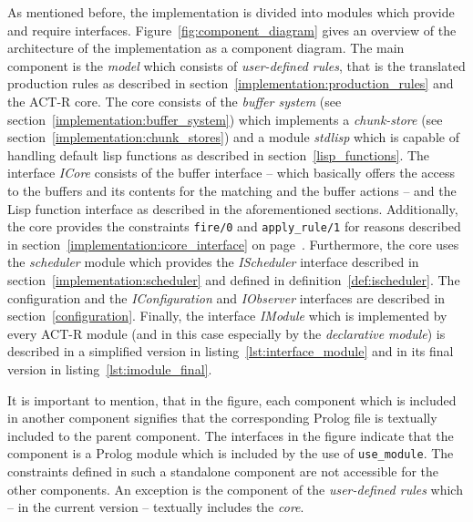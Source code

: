 As mentioned before, the implementation is divided into modules which provide and require interfaces. Figure~\ref{fig:component_diagram} gives an overview of the architecture of the implementation as a component diagram. The main component is the \emph{model} which consists of \emph{user-defined rules}, that is the translated production rules as described in section~\ref{implementation:production_rules} and the ACT-R core. The core consists of the \emph{buffer system} (see section~\ref{implementation:buffer_system}) which implements a \emph{chunk-store} (see section~\ref{implementation:chunk_stores}) and a module \emph{stdlisp} which is capable of handling default lisp functions as described in section~\ref{lisp_functions}. The interface \emph{ICore} consists of the buffer interface -- which basically offers the access to the buffers and its contents for the matching and the buffer actions -- and the Lisp function interface as described in the aforementioned sections. Additionally, the core provides the constraints \lstinline|fire/0| and \lstinline|apply_rule/1| for reasons described in section~\ref{implementation:icore_interface} on page~\pageref{implementation:icore_interface}. Furthermore, the core uses the \emph{scheduler} module which provides the \emph{IScheduler} interface described in section~\ref{implementation:scheduler} and defined in definition~\ref{def:ischeduler}. The configuration and the \emph{IConfiguration} and \emph{IObserver} interfaces are described in section~\ref{configuration}. Finally, the interface \emph{IModule} which is implemented by every ACT-R module (and in this case especially by the \emph{declarative module}) is described in a simplified version in listing~\ref{lst:interface_module} and in its final version in listing~\ref{lst:imodule_final}.

It is important to mention, that in the figure, each component which is included in another component signifies that the corresponding Prolog file is textually included to the parent component. The interfaces in the figure indicate that the component is a Prolog module which is included by the use of \lstinline|use_module|. The constraints defined in such a standalone component are not accessible for the other components. An exception is the component of the \emph{user-defined rules} which -- in the current version -- textually includes the \emph{core}.

